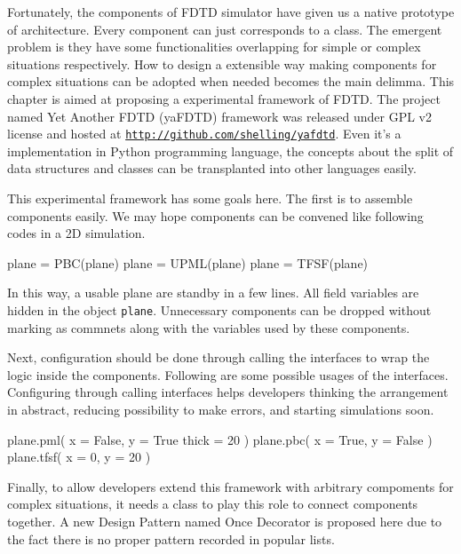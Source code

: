 Fortunately, the components of FDTD simulator have given us a native prototype of architecture. Every component can just
corresponds to a class. The emergent problem is they have some functionalities overlapping for simple or complex
situations respectively. How to design a extensible way making components for complex situations can be adopted when
needed becomes the main delimma. This chapter is aimed at proposing a experimental framework of FDTD. The project
named Yet Another FDTD (yaFDTD) framework was released under GPL v2 license and hosted at
\texttt{\url{http://github.com/shelling/yafdtd}}. Even it's a implementation in Python programming language, the
concepts about the split of data structures and classes can be transplanted into other languages easily.

This experimental framework has some goals here. The first is to assemble components easily. We may hope components can
be convened like following codes in a 2D simulation.
\begin{code}
  plane = PBC(plane)
  plane = UPML(plane)
  plane = TFSF(plane)
\end{code}
In this way, a usable plane are standby in a few lines. All field variables are hidden in the object
\texttt{plane}. Unnecessary components can be dropped without marking as commnets along with the variables used by these
components.

Next, configuration should be done through calling the interfaces to wrap the logic inside the components. Following are
some possible usages of the interfaces. Configuring through calling interfaces helps developers thinking the arrangement
in abstract, reducing possibility to make errors, and starting simulations soon.
\begin{code}
  plane.pml(
    x = False,
    y = True
    thick = 20
  )
  plane.pbc(
    x = True,
    y = False
  )
  plane.tfsf(
    x = 0,
    y = 20
  )
\end{code}
Finally, to allow developers extend this framework with arbitrary compoments for complex situations, it needs a class to
play this role to connect components together. A new Design Pattern named Once Decorator is proposed here due to the
fact there is no proper pattern recorded in popular lists.
